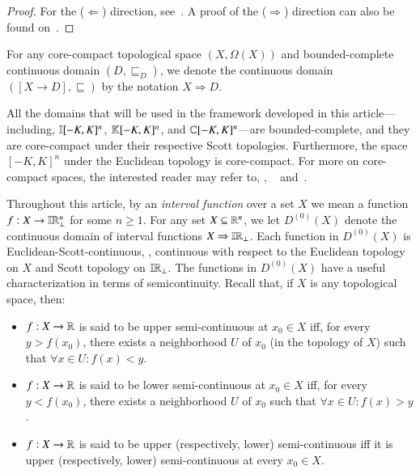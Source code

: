 \documentclass[11pt,times]{article}
\begin{document}
\begin{proof}
  For the ($\Leftarrow$) direction,
  see~\parencite[Proposition~2]{Erker_et_al:way_below:1998}. A proof
  of the ($\Rightarrow$) direction can also be found
  on~\parencite[pages 62 and 63]{Erker_et_al:way_below:1998}.
\end{proof}

  \begin{notation}[$X \Rightarrow D$]
    \label{notation:fun_space}
    For any core-compact topological space $(X, \Omega(X))$ and
    bounded-complete continuous domain $(D, \sqsubseteq_D)$, we denote
    the continuous domain $([X \to D], \sqsubseteq)$ by the notation
    $X \Rightarrow D$.
  \end{notation}


  
  All the domains that will be used in the framework developed in this
  article---including, $\intvaldom[{[-K,K]^n}]$, $\kCPPO{[-K,K]^n}$,
  and $\cCPPO{[-K,K]^n}$---are bounded-complete, and they are
  core-compact under their respective Scott topologies. Furthermore,
  the space $[-K,K]^n$ under the Euclidean topology is
  core-compact. For more on core-compact spaces, the interested reader
  may refer to, {\eg}, ~\parencite[Chapter~II]{Compendium:Book:1980}
  and~\parencite[Chapter~5]{Goubault-Larrecq:Non_Hausdorff_topology:2013}.

\label{page:interval_function}
  
  Throughout this article, by an \emph{interval function} over a set
  $X$ we mean a function $f: X \to \intvaldom[\R^n\lift]$ for some
  $n \geq 1$. For any set $X \subseteq \R^n$, we let $D^{(0)}(X)$
  denote the continuous domain of interval functions
  $X \Rightarrow \intvaldom[\R\lift]$. Each function in $D^{(0)}(X)$
  is Euclidean-Scott-continuous, {\ie}, continuous with respect to the
  Euclidean topology on $X$ and Scott topology on
  $\intvaldom[\R\lift]$. The functions in $D^{(0)}(X)$ have a useful
  characterization in terms of semicontinuity. Recall that, if $X$ is
  any topological space, then:

\begin{itemize}
\item $f: X \to \R$ is said to be upper semi-continuous at $x_0 \in X$
  iff, for every $y > f(x_0)$, there exists a neighborhood $U$ of
  $x_0$ (in the topology of $X$) such that
  $\forall x \in U: f(x) < y$. 


\item $f: X \to \R$ is said to be lower semi-continuous at $x_0 \in X$
  iff, for every $y < f(x_0)$, there exists a neighborhood $U$ of
  $x_0$ such that $\forall x \in U: f(x) > y$. 

  
\item $f: X \to \R$ is said to be upper (respectively, lower)
  semi-continuous iff it is upper (respectively, lower)
  semi-continuous at every $x_0 \in X$.

\end{itemize}
\end{document}
